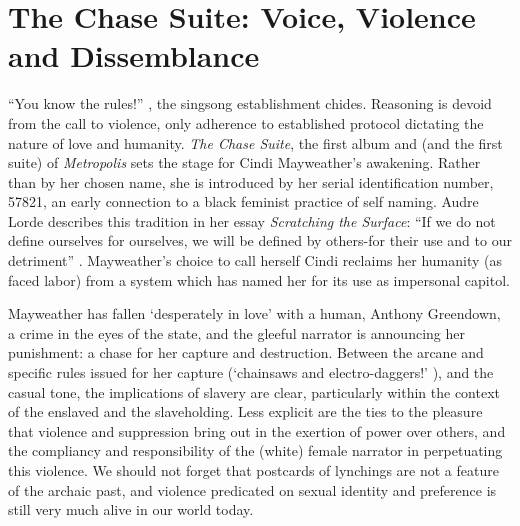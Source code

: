 \documentclass[a4paper, 11pt]{article} %
\begin{document}

\section*{The Chase Suite: Voice, Violence and Dissemblance}

``You know the rules!'' \cite{wolfmasters}, the singsong establishment chides.
Reasoning is devoid from the call to violence, only adherence to established protocol dictating the nature of love and humanity.
\emph{The Chase Suite}, the first album and (and the first suite) of \emph{Metropolis} sets the stage for Cindi Mayweather's awakening.
Rather than by her chosen name, she is introduced by her serial identification number, 57821, an early connection to a black feminist practice of self naming. 
Audre Lorde describes this tradition in her essay \emph{Scratching the Surface}: ``If we do not define ourselves for ourselves, we will be defined by others-for their use and to our detriment'' \cite{lordescratching}.
Mayweather's choice to call herself Cindi reclaims her humanity (as faced labor) from a system which has named her for its use as impersonal capitol.

Mayweather has fallen `desperately in love' with a human, Anthony Greendown, a crime in the eyes of the state, and the gleeful narrator is announcing her punishment: a chase for her capture and destruction.
Between the arcane and specific rules issued for her capture (`chainsaws and electro-daggers!' \cite{wolfmasters}), and the casual tone, the implications of slavery are clear, particularly within the context of the enslaved and the slaveholding. 
Less explicit are the ties to the pleasure that violence and suppression bring out in the exertion of power over others, and the compliancy and responsibility of the (white) female narrator in perpetuating this violence.
We should not forget that postcards of lynchings are not a feature of the archaic past, and violence predicated on sexual identity and preference is still very much alive in our world today.
\end{document}
